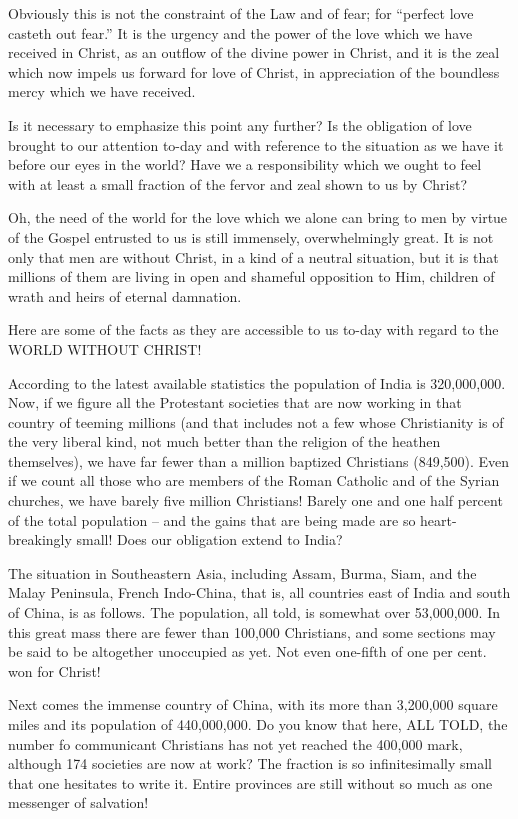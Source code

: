 \documentclass[
]{book}
\begin{document}
Obviously this is not the constraint of the Law and of fear; for ``perfect love casteth out fear.'' It is the urgency and the power of the love which we have received in Christ, as an outflow of the divine power in Christ, and it is the zeal which now impels us forward for love of Christ, in appreciation of the boundless mercy which we have received.

Is it necessary to emphasize this point any further? Is the obligation of love brought to our attention to-day and with reference to the situation as we have it before our eyes in the world? Have we a responsibility which we ought to feel with at least a small fraction of the fervor and zeal shown to us by Christ?

Oh, the need of the world for the love which we alone can bring to men by virtue of the Gospel entrusted to us is still immensely, overwhelmingly great. It is not only that men are without Christ, in a kind of a neutral situation, but it is that millions of them are living in open and shameful opposition to Him, children of wrath and heirs of eternal damnation.

Here are some of the facts as they are accessible to us to-day with regard to the WORLD WITHOUT CHRIST!

According to the latest available statistics the population of India is 320,000,000. Now, if we figure all the Protestant societies that are now working in that country of teeming millions (and that includes not a few whose Christianity is of the very liberal kind, not much better than the religion of the heathen themselves), we have far fewer than a million baptized Christians (849,500). Even if we count all those who are members of the Roman Catholic and of the Syrian churches, we have barely five million Christians! Barely one and one half percent of the total population -- and the gains that are being made are so heart-breakingly small! Does our obligation extend to India?

The situation in Southeastern Asia, including Assam, Burma, Siam, and the Malay Peninsula, French Indo-China, that is, all countries east of India and south of China, is as follows. The population, all told, is somewhat over 53,000,000. In this great mass there are fewer than 100,000 Christians, and some sections may be said to be altogether unoccupied as yet. Not even one-fifth of one per cent. won for Christ!

Next comes the immense country of China, with its more than 3,200,000 square miles and its population of 440,000,000. Do you know that here, ALL TOLD, the number fo communicant Christians has not yet reached the 400,000 mark, although 174 societies are now at work? The fraction is so infinitesimally small that one hesitates to write it. Entire provinces are still without so much as one messenger of salvation!
\end{document}
